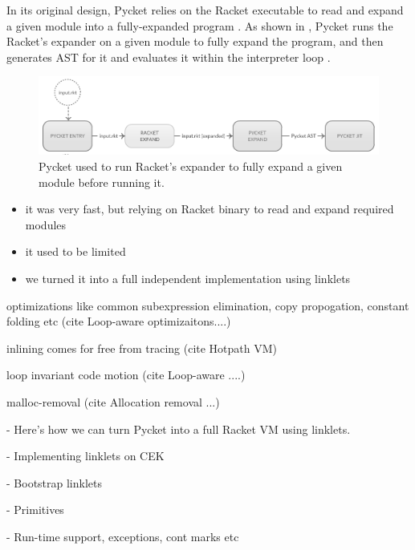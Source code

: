 In its original design, Pycket relies on the Racket executable to read
and expand a given module into a fully-expanded program
\cite{samth:11}. As shown in , Pycket runs the
Racket's expander on a given module to fully expand the program, and
then generates AST for it and evaluates it within the interpreter
loop \cite{pycket15}.

\begin{figure}[h!]
  \centering
\includegraphics[scale=0.3]{img/old-pycket-grayscale}
\caption{Pycket used to run Racket's expander to fully expand a given module before running it.}
\label{fig:old-pycket}
\end{figure}


\begin{itemize}
  \item it was very fast, but relying on Racket binary to read and expand required modules
\item it used to be limited
\item we turned it into a full independent implementation using linklets
\end{itemize}


optimizations like common subexpression elimination, copy propogation, constant folding etc (cite Loop-aware optimizaitons....)

inlining comes for free from tracing (cite Hotpath VM)

loop invariant code motion (cite Loop-aware ....)

malloc-removal (cite Allocation removal ...)


- Here's how we can turn Pycket into a full Racket VM using linklets.

- Implementing linklets on CEK

- Bootstrap linklets

- Primitives

- Run-time support, exceptions, cont marks etc

